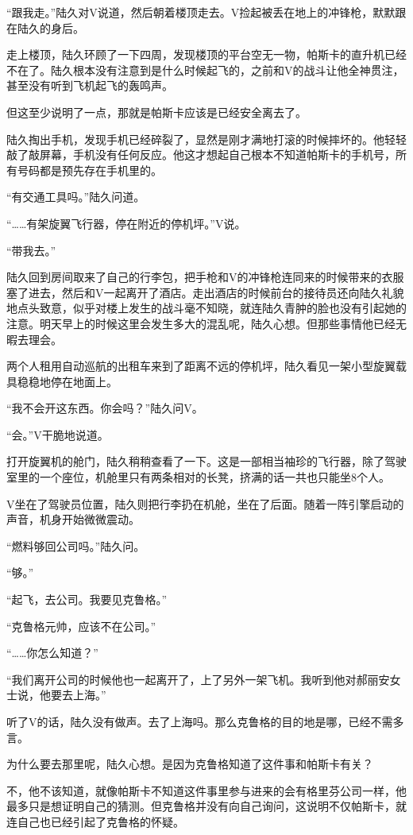 “跟我走。”陆久对V说道，然后朝着楼顶走去。V捡起被丢在地上的冲锋枪，默默跟在陆久的身后。

走上楼顶，陆久环顾了一下四周，发现楼顶的平台空无一物，帕斯卡的直升机已经不在了。陆久根本没有注意到是什么时候起飞的，之前和V的战斗让他全神贯注，甚至没有听到飞机起飞的轰鸣声。

但这至少说明了一点，那就是帕斯卡应该是已经安全离去了。

陆久掏出手机，发现手机已经碎裂了，显然是刚才满地打滚的时候摔坏的。他轻轻敲了敲屏幕，手机没有任何反应。他这才想起自己根本不知道帕斯卡的手机号，所有号码都是预先存在手机里的。

“有交通工具吗。”陆久问道。

“……有架旋翼飞行器，停在附近的停机坪。”V说。

“带我去。”

陆久回到房间取来了自己的行李包，把手枪和V的冲锋枪连同来的时候带来的衣服塞了进去，然后和V一起离开了酒店。走出酒店的时候前台的接待员还向陆久礼貌地点头致意，似乎对楼上发生的战斗毫不知晓，就连陆久青肿的脸也没有引起她的注意。明天早上的时候这里会发生多大的混乱呢，陆久心想。但那些事情他已经无暇去理会。

两个人租用自动巡航的出租车来到了距离不远的停机坪，陆久看见一架小型旋翼载具稳稳地停在地面上。

“我不会开这东西。你会吗？”陆久问V。

“会。”V干脆地说道。

打开旋翼机的舱门，陆久稍稍查看了一下。这是一部相当袖珍的飞行器，除了驾驶室里的一个座位，机舱里只有两条相对的长凳，挤满的话一共也只能坐8个人。

V坐在了驾驶员位置，陆久则把行李扔在机舱，坐在了后面。随着一阵引擎启动的声音，机身开始微微震动。

“燃料够回公司吗。”陆久问。

“够。”

“起飞，去公司。我要见克鲁格。”

“克鲁格元帅，应该不在公司。”

“……你怎么知道？”

“我们离开公司的时候他也一起离开了，上了另外一架飞机。我听到他对郝丽安女士说，他要去上海。”

听了V的话，陆久没有做声。去了上海吗。那么克鲁格的目的地是哪，已经不需多言。

为什么要去那里呢，陆久心想。是因为克鲁格知道了这件事和帕斯卡有关？

不，他不该知道，就像帕斯卡不知道这件事里参与进来的会有格里芬公司一样，他最多只是想证明自己的猜测。但克鲁格并没有向自己询问，这说明不仅帕斯卡，就连自己也已经引起了克鲁格的怀疑。

